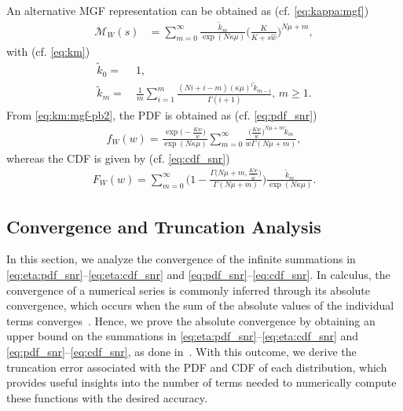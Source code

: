 \documentclass[journal,twocolumn]{IEEEtran}
\begin{document}
An alternative \ac{MGF} representation can be obtained  as (cf. \eqref{eq:kappa:mgf})
\begin{align} \label{eq:km:mgf-pb2}
        \mathcal{M}_{W}(s)&=  \sum_{m=0}^{\infty} \frac{\tilde{k}_m}{\exp(N \kappa \mu)} \bigg(\frac{  K }{ K + s \hat{w} }\bigg)^{N\mu +m} ,
\end{align}
with (cf. \eqref{eq:km})
\begin{subequations} \label{eq:km:pb-km}
\begin{align}
    \tilde{k}_0 = \ & 1, \label{eq:km:pb-km-0} \\
    \tilde{k}_m = \ & \frac{1}{m} \sum _{i=1}^m \frac{(N i +i-m)(\kappa \mu )^i \tilde{k}_{m-i}}{\Gamma(i+1)}, \, m\geq 1. \label{eq:km:pb-km-m}
\end{align}
\end{subequations}
From \eqref{eq:km:mgf-pb2}, the PDF is obtained as (cf. \eqref{eq:pdf_snr})
\begin{align} \label{eq:kappa:pdf_snr2}
        f_{W}(w) = \frac{\exp\big(\!-\frac{K w}{\hat{w}}\big)}{\exp(N\kappa\mu) } \sum_{m=0}^{\infty}\frac{ \big(\frac{K w}{\hat{w}}\big)^{N \mu + m} \tilde{k}_m}{ w \Gamma (N \mu + m )},
\end{align}
whereas the CDF is given by (cf. \eqref{eq:cdf_snr})
\begin{align} \label{eq:kappa:cdf_snr2}
        F_{W}(w) = \sum_{m=0}^{\infty}\Bigg(1-\frac{ \Gamma \big(N \mu + m,\frac{ K w}{\hat{w} }\big)}{ \Gamma (N \mu + m )}\Bigg)\frac{\tilde{k}_m}{\exp(N\kappa\mu)}.
\end{align}

\subsection{Convergence and Truncation Analysis} \label{sec:trunc}

In this section, we analyze the convergence of the infinite summations in \eqref{eq:eta:pdf_snr}--\eqref{eq:eta:cdf_snr} and \eqref{eq:pdf_snr}--\eqref{eq:cdf_snr}. In calculus, the convergence of a numerical series is commonly inferred through its absolute convergence, which occurs when the sum of the absolute values of the individual terms converges~\cite[Eq.~(0.21)]{Gra07}. Hence, we prove the absolute convergence by obtaining an upper bound on the summations in \eqref{eq:eta:pdf_snr}--\eqref{eq:eta:cdf_snr} and \eqref{eq:pdf_snr}--\eqref{eq:cdf_snr}, as done in~\cite{Alm23a}. With this outcome, we derive the truncation error associated with the \ac{PDF} and \ac{CDF} of each distribution, which provides useful insights into the number of terms needed to numerically compute these functions with the desired accuracy.
\end{document}
